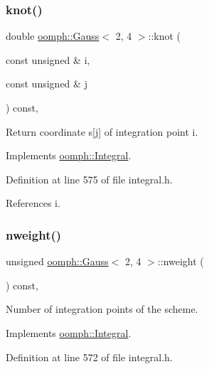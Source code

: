 \subsubsection{\texorpdfstring{knot()}{knot()}}
{\footnotesize\ttfamily double \hyperlink{classoomph_1_1Gauss}{oomph\+::\+Gauss}$<$ 2, 4 $>$\+::knot (\begin{DoxyParamCaption}\item[{const unsigned \&}]{i,  }\item[{const unsigned \&}]{j }\end{DoxyParamCaption}) const\hspace{0.3cm}{\ttfamily [inline]}, {\ttfamily [virtual]}}



Return coordinate s\mbox{[}j\mbox{]} of integration point i. 



Implements \hyperlink{classoomph_1_1Integral_a1a2122f99a87c18649bafdd9ed739758}{oomph\+::\+Integral}.



Definition at line 575 of file integral.\+h.



References i.

\mbox{\label{classoomph_1_1Gauss_3_012_00_014_01_4_a7acd818350e2a6dc91aea4c6440a0da2}} 
\subsubsection{\texorpdfstring{nweight()}{nweight()}}
{\footnotesize\ttfamily unsigned \hyperlink{classoomph_1_1Gauss}{oomph\+::\+Gauss}$<$ 2, 4 $>$\+::nweight (\begin{DoxyParamCaption}{ }\end{DoxyParamCaption}) const\hspace{0.3cm}{\ttfamily [inline]}, {\ttfamily [virtual]}}



Number of integration points of the scheme. 



Implements \hyperlink{classoomph_1_1Integral_a1a270de9d99a1fcf1d25a6c1017f65fa}{oomph\+::\+Integral}.



Definition at line 572 of file integral.\+h.

